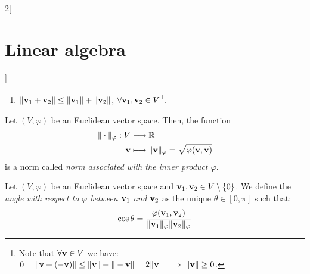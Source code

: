 \documentclass[../../../main.tex]{subfiles}
\begin{document}
\begin{multicols}{2}[\section{Linear algebra}]
\begin{definition}
\begin{enumerate}
      \item $\|\vb{v}_1+\vb{v}_2\|\leq\|\vb{v}_1\|+\|\vb{v}_2\|$, $\forall \vb{v}_1,\vb{v}_2\in V$\footnote{Note that $\forall\vb{v}\in V$ we have: $0=\|\vb{v}+(-\vb{v})\|\leq\|\vb{v}\|+\|-\vb{v}\|=2\|\vb{v}\|\implies\|\vb{v}\|\geq 0$.}.
    \end{enumerate}
  \end{definition}
  \begin{prop}
    Let $(V,\varphi)$ be an Euclidean vector space. Then, the function
    \begin{align*}
      \|\cdot\|_\varphi:V & \longrightarrow\mathbb{R}                                                               \\
      \vb{v}       & \longmapsto\|\vb{v}\|_\varphi=\sqrt{\varphi(\vb{v},\vb{v})}
    \end{align*}
    is a norm called \textit{norm associated with the inner product $\varphi$}.
  \end{prop}
  \begin{definition}
    Let $(V,\varphi)$ be an Euclidean vector space and $\vb{v}_1,\vb{v}_2\in V\setminus\{0\}$. We define the \textit{angle with respect to $\varphi$ between $\vb{v}_1$ and $\vb{v}_2$} as the unique $\theta\in[0,\pi]$ such that: $$\cos{\theta}=\frac{\varphi(\vb{v}_1,\vb{v}_2)}{\|\vb{v}_1\|_\varphi\|\vb{v}_2\|_\varphi}$$
  \end{definition}

\end{multicols}
\end{document}
